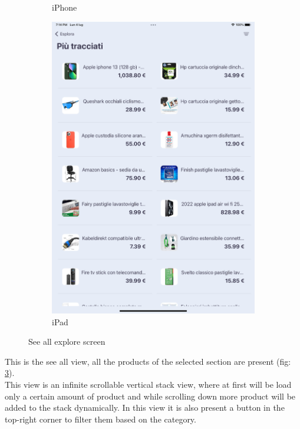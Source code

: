 \begin{figure}[h!]
\begin{subfigure}[b]{0.3\textwidth}
            \caption{iPhone}
            \label{fig:see_all_explore_screen_iphone}
        \end{subfigure}
        \begin{subfigure}[b]{0.45\textwidth}
            \centering
            \includegraphics[width=\textwidth]{images/interfaces/see_all_explore_screen_ipad.png}
            \caption{iPad}
            \label{fig:see_all_explore_screen_ipad}
        \end{subfigure}
         \caption{See all explore screen}
        \label{fig:see_all_explore_screen}
\end{figure}
\FloatBarrier
This is the see all view, all the products of the selected section are present (fig: \ref{fig:see_all_explore_screen}).\\
This view is an infinite scrollable vertical stack view, where at first will be load only a certain amount of product and while scrolling down more product will be added to the stack dynamically.
In this view it is also present a button in the top-right corner to filter them based on the category.

